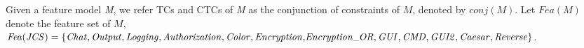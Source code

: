 Given a feature model \emph{M}, we refer TCs and CTCs of \emph{M} as  the conjunction of constraints of $M$, denoted by $\mathit{conj(M)}$. Let $\mathit{Fea(M)}$ denote the feature set of $M$, $\mathit{Fea(JCS)} = \{\scriptsize{\mathit{Chat}, \mathit{Output}, \mathit{Logging}, \mathit{Authorization}, \mathit{Color}, \mathit{Encryption},} \\ \scriptsize{\mathit{Encryption\_OR}, \mathit{GUI}, \mathit{CMD}, \mathit{GUI2}, \mathit{Caesar}, \mathit{Reverse}}\}$.%





